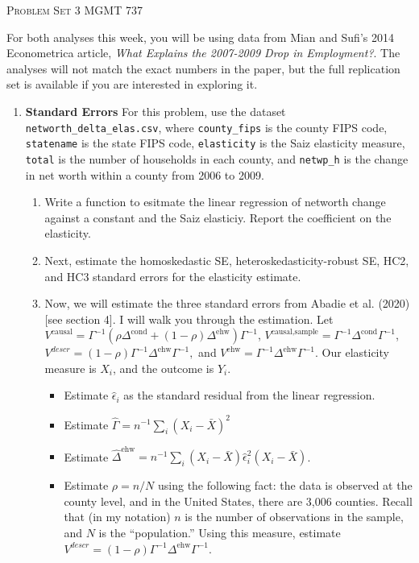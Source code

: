 \documentclass[11pt, a4paper]{article}
\begin{document}
\begin{center}
  {\Large \textsc{Problem Set 3}}
  MGMT 737
\end{center}

For both analyses this week, you will be using data from Mian and
Sufi's 2014 Econometrica article, \textit{What Explains the 2007-2009
  Drop in Employment?}. The analyses will not match the exact
numbers in the paper, but the full replication set is available if you are interested in exploring it.

\begin{enumerate}
\item \textbf{Standard Errors} For this problem, use the dataset \texttt{networth\_delta\_elas.csv}, where \texttt{county\_fips} is the county FIPS code, \texttt{statename} is the state FIPS code, \texttt{elasticity} is the Saiz elasticity measure, \texttt{total} is the number of households in each county, and \texttt{netwp\_h} is the change in net worth within a county from 2006 to 2009.
  \begin{enumerate}
  \item Write a function to esitmate the linear regression of networth change against a constant and the Saiz elasticiy. Report the coefficient on the elasticity. 
  \item Next, estimate the homoskedastic SE, heteroskedasticity-robust SE, HC2, and HC3 standard errors for the elasticity estimate.
  \item Now, we will estimate the three standard errors from Abadie et al. (2020) [see section 4]. I will walk you through the estimation. Let $V^{\text{causal}} = \Gamma^{-1}(\rho\Delta^{\text{cond}} + (1-\rho)\Delta^{\text{ehw}})\Gamma^{-1}$, $V^{\text{causal,sample}} = \Gamma^{-1}\Delta^{\text{cond}}\Gamma^{-1}$, $V^{descr} = (1-\rho)\Gamma^{-1}\Delta^{\text{ehw}}\Gamma^{-1},$ and $V^{\text{ehw}} = \Gamma^{-1}\Delta^{\text{ehw}}\Gamma^{-1}.$ Our elasticity measure is $X_{i}$, and the outcome is $Y_{i}$.
    \begin{itemize}
    \item Estimate $\hat{\epsilon}_{i}$ as the standard residual from
      the linear regression.
    \item Estimate $\hat{\Gamma} = n^{-1}\sum_{i}(X_{i} - \bar{X})^{2}$
    \item Estimate $\hat{\Delta}^{\text{ehw}} = n^{-1}\sum_{i}(X_{i} - \bar{X})\hat{\epsilon}^{2}_{i}(X_{i} - \bar{X})$.
    \item Estimate $\rho = n/N$ using the following fact: the data is observed at the county level, and in the United States, there are 3,006 counties. Recall that (in my notation) $n$ is the number of observations in the sample, and $N$ is the ``population.'' Using this measure, estimate $V^{descr} = (1-\rho)\Gamma^{-1}\Delta^{\text{ehw}}\Gamma^{-1}$.

\end{itemize}
\end{enumerate}
\end{enumerate}
\end{document}
